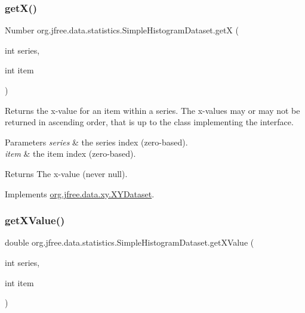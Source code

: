 \subsubsection{\texorpdfstring{get\+X()}{getX()}}
{\footnotesize\ttfamily Number org.\+jfree.\+data.\+statistics.\+Simple\+Histogram\+Dataset.\+getX (\begin{DoxyParamCaption}\item[{int}]{series,  }\item[{int}]{item }\end{DoxyParamCaption})}

Returns the x-\/value for an item within a series. The x-\/values may or may not be returned in ascending order, that is up to the class implementing the interface.


\begin{DoxyParams}{Parameters}
{\em series} & the series index (zero-\/based). \\
\hline
{\em item} & the item index (zero-\/based).\\
\hline
\end{DoxyParams}
\begin{DoxyReturn}{Returns}
The x-\/value (never {\ttfamily null}). 
\end{DoxyReturn}


Implements \mbox{\hyperlink{interfaceorg_1_1jfree_1_1data_1_1xy_1_1_x_y_dataset_a85c75ba5b69b551e96afd29d1732ba22}{org.\+jfree.\+data.\+xy.\+X\+Y\+Dataset}}.

\mbox{\label{classorg_1_1jfree_1_1data_1_1statistics_1_1_simple_histogram_dataset_abe5b334c787c634308cfd38c39be0a22}} 
\subsubsection{\texorpdfstring{get\+X\+Value()}{getXValue()}}
{\footnotesize\ttfamily double org.\+jfree.\+data.\+statistics.\+Simple\+Histogram\+Dataset.\+get\+X\+Value (\begin{DoxyParamCaption}\item[{int}]{series,  }\item[{int}]{item }\end{DoxyParamCaption})}

